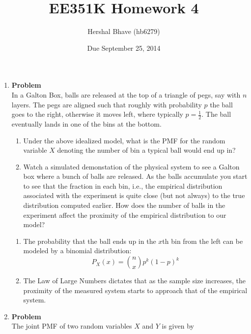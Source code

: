 \documentclass[12pt]{article}
\title{EE351K Homework 4}
\author{Hershal Bhave (hb6279)}
\date{Due September 25, 2014}
\newenvironment{Ex}{\textbf{Problem}\vspace{.75em}\\}{}
\begin{document}
\maketitle
\begin{enumerate}
\item
  \begin{Ex}
    In a Galton Box, balls are released at the top of a triangle of
    pegs, say with $n$ layers. The pegs are aligned such that roughly
    with probability $p$ the ball goes to the right, otherwise it
    moves left, where typically $p = \frac{1}{2}$. The ball eventually
    lands in one of the bins at the bottom.
    \begin{enumerate}
    \item Under the above idealized model, what is the PMF for the
      random variable $X$ denoting the number of bin a typical ball
      would end up in?
    \item Watch a simulated demonstation of the physical system to
      see a Galton box where a bunch of balls are released. As the
      balls accumulate you start to see that the fraction in each bin,
      i.e., the empirical distribution associated with the experiment
      is quite close (but not always) to the true distribution
      computed earlier. How does the number of balls in the experiment
      affect the proximity of the empirical distribution to our model?
    \end{enumerate}
    \begin{solution} \hfill
      \begin{enumerate}
      \item The probability that the ball ends up in the $x$th bin
        from the left can be modeled by a binomial distribution:
        \begin{equation}
          \label{eq:1a-binomial-dist}
          P_X(x) = {n \choose x} p^k(1-p)^k
        \end{equation}
      \item The Law of Large Numbers dictates that as the sample size
        increases, the proximity of the measured system starts to
        approach that of the empirical system.
      \end{enumerate}
    \end{solution}
  \end{Ex}
\item
  \begin{Ex}
    The joint PMF of two random variables $X$ and $Y$ is given by
    \begin{equation*}

\end{equation*}
\end{Ex}
\end{enumerate}
\end{document}
